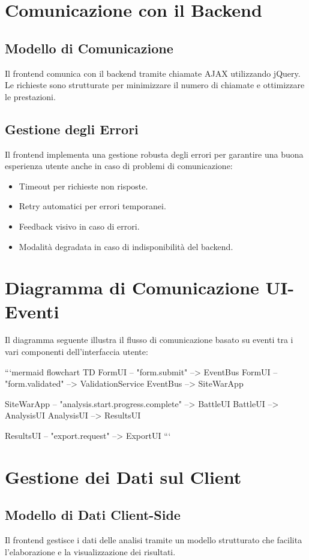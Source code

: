 \section{Comunicazione con il Backend}

\subsection{Modello di Comunicazione}
Il frontend comunica con il backend tramite chiamate AJAX utilizzando jQuery. Le richieste sono strutturate per minimizzare il numero di chiamate e ottimizzare le prestazioni.

\subsection{Gestione degli Errori}
Il frontend implementa una gestione robusta degli errori per garantire una buona esperienza utente anche in caso di problemi di comunicazione:
\begin{itemize}
    \item Timeout per richieste non risposte.
    \item Retry automatici per errori temporanei.
    \item Feedback visivo in caso di errori.
    \item Modalità degradata in caso di indisponibilità del backend.
\end{itemize}

\section{Diagramma di Comunicazione UI-Eventi}
Il diagramma seguente illustra il flusso di comunicazione basato su eventi tra i vari componenti dell'interfaccia utente:

```mermaid
flowchart TD
    FormUI -- "form.submit" --> EventBus
    FormUI -- "form.validated" --> ValidationService
    EventBus --> SiteWarApp
    
    SiteWarApp -- "analysis.start\nanalysis.progress\nanalysis.complete" --> BattleUI
    BattleUI --> AnalysisUI
    AnalysisUI --> ResultsUI
    
    ResultsUI -- "export.request" --> ExportUI
```

\section{Gestione dei Dati sul Client}

\subsection{Modello di Dati Client-Side}
Il frontend gestisce i dati delle analisi tramite un modello strutturato che facilita l'elaborazione e la visualizzazione dei risultati.

